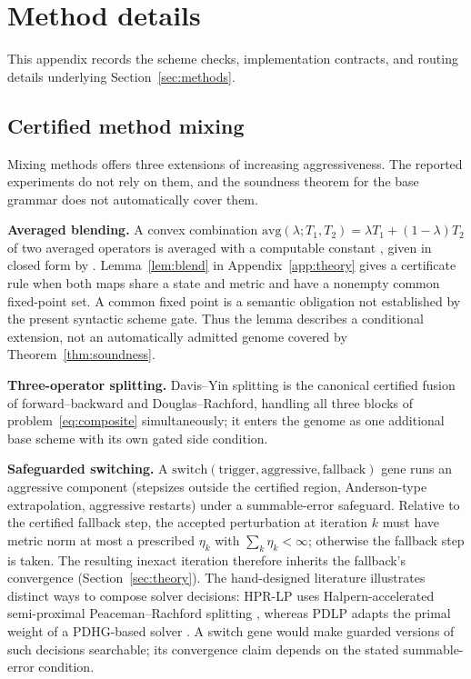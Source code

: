 \section{Method details}
\label{app:methods}

This appendix records the scheme checks, implementation contracts, and routing details underlying Section~\ref{sec:methods}.

\subsection{Certified method mixing}

Mixing methods offers three extensions of increasing aggressiveness. The
reported experiments do not rely on them, and the soundness theorem for the
base grammar does not automatically cover them.

\textbf{Averaged blending.} A convex combination
$\mathrm{avg}(\lambda; T_1, T_2) = \lambda T_1 + (1-\lambda) T_2$ of two
averaged operators is averaged with a computable constant
\citep[\S2.3]{RyuYin2022LargeScale}, given in closed form by
\citet{CombettesYamada2015Compositions}.
Lemma~\ref{lem:blend} in Appendix~\ref{app:theory} gives a certificate rule
when both maps share a state and metric and have a nonempty common
fixed-point set. A common fixed point is a semantic obligation not established
by the present syntactic scheme gate. Thus the lemma describes a conditional
extension, not an automatically admitted genome covered by
Theorem~\ref{thm:soundness}.

\textbf{Three-operator splitting.} Davis--Yin splitting
\citep{DavisYin2017Three} is the canonical certified fusion of
forward--backward and Douglas--Rachford, handling all three blocks of
problem~\eqref{eq:composite} simultaneously; it enters the genome as one
additional base scheme with its own gated side condition.

\textbf{Safeguarded switching.} A $\mathrm{switch}(\text{trigger},
\text{aggressive}, \text{fallback})$ gene runs an aggressive component
(stepsizes outside the certified region, Anderson-type extrapolation,
aggressive restarts) under a summable-error safeguard. Relative to the
certified fallback step, the accepted perturbation at iteration $k$ must have
metric norm at most a prescribed $\eta_k$ with $\sum_k\eta_k<\infty$;
otherwise the fallback step is taken. The resulting inexact iteration
therefore inherits the fallback's convergence (Section~\ref{sec:theory}). The hand-designed
literature illustrates distinct ways to compose solver decisions: HPR-LP
uses Halpern-accelerated semi-proximal Peaceman--Rachford splitting
\citep{Chen2024HPRLP}, whereas PDLP adapts the primal weight of a PDHG-based
solver \citep{Applegate2021Practical}. A switch gene would make guarded
versions of such decisions searchable; its convergence claim depends on the
stated summable-error condition.

